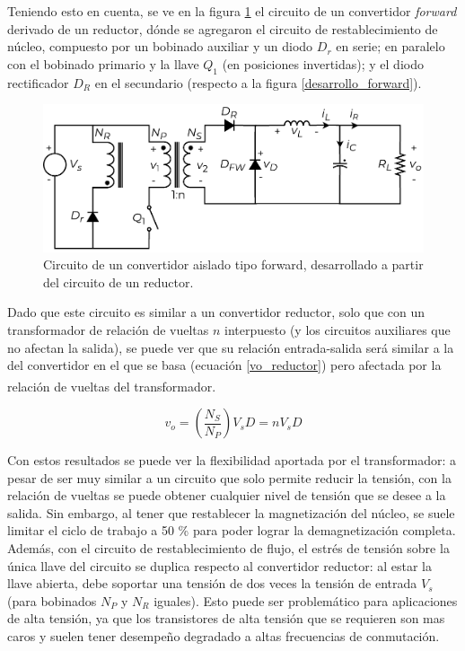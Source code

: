 Teniendo esto en cuenta, se ve en la figura \ref{forward} el circuito de un {\Medium convertidor \textit{forward}} derivado de un reductor, dónde se agregaron el circuito de restablecimiento de núcleo, compuesto por un bobinado auxiliar y un diodo $D_r$ en serie; en paralelo con el bobinado primario y la llave $Q_1$ (en posiciones invertidas); y el diodo rectificador $D_R$ en el secundario (respecto a la figura \ref{desarrollo_forward}).\\

\begin{figure}[h]
    \centering
    \includegraphics[scale=0.6]{Imagenes/Forward.pdf}
    \caption{Circuito de un convertidor aislado tipo forward, desarrollado a partir del circuito de un reductor.}
    \label{forward}
\end{figure}

Dado que este circuito es similar a un convertidor reductor, solo que con un transformador de relación de vueltas $n$ interpuesto (y los circuitos auxiliares que no afectan la salida), se puede ver que su relación entrada-salida será similar a la del convertidor en el que se basa (ecuación \ref{vo_reductor}) pero afectada por la relación de vueltas del transformador.\textsuperscript{\cite{PotenciaHart}}

\begin{equation}\label{vo_forward}
    \boxed{
        v_o = \left(\frac{N_S}{N_P}\right)V_sD = nV_sD
    }
\end{equation}

Con estos resultados se puede ver la flexibilidad aportada por el transformador: a pesar de ser muy similar a un circuito que solo permite reducir la tensión, con la relación de vueltas se puede obtener cualquier nivel de tensión que se desee a la salida. Sin embargo, al tener que restablecer la magnetización del núcleo, se suele limitar el ciclo de trabajo a 50 \% para poder lograr la demagnetización completa.\\

Además, con el circuito de restablecimiento de flujo, el estrés de tensión sobre la única llave del circuito se duplica respecto al convertidor reductor: al estar la llave abierta, debe soportar una tensión de dos veces la tensión de entrada $V_s$ (para bobinados $N_P$ y $N_R$ iguales). Esto puede ser problemático para aplicaciones de alta tensión, ya que los transistores de alta tensión que se requieren son mas caros y suelen tener desempeño degradado a altas frecuencias de conmutación.\\

